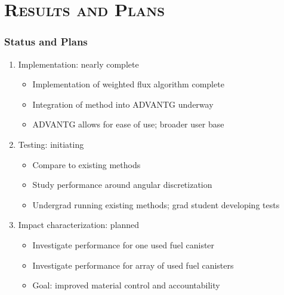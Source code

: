 \documentclass[handout]{beamer}
\renewcommand{\(}{\begin{columns}}
\renewcommand{\)}{\end{columns}}
\newcommand{\<}[1]{\begin{column}{#1}}
\renewcommand{\>}{\end{column}}
\begin{document}
\section{\scshape Results and Plans}
\begin{frame}[fragile]
  \frametitle{Status and Plans}

    \begin{enumerate}
    \item Implementation: nearly complete
      \begin{itemize}
      \item Implementation of weighted flux algorithm%
       \alert{complete}
      \item Integration of method into ADVANTG \alert{underway}
      \item ADVANTG allows for ease of use; broader user base
      \end{itemize} 
      \vspace*{0.5em}
      \pause
    \item Testing: initiating
      \begin{itemize}
      \item Compare to existing methods
      \item Study performance around angular discretization
      \item Undergrad running existing methods; grad student developing tests
      \end{itemize}
      \vspace*{0.5em}
      \pause
    \item Impact characterization: planned
      \begin{itemize}
      \item Investigate performance for one used fuel canister
      \item Investigate performance for array of used fuel canisters
      \item \alert{Goal}: improved material control and accountability
      \end{itemize}
    \end{enumerate}

	
\end{frame}
\end{document}
